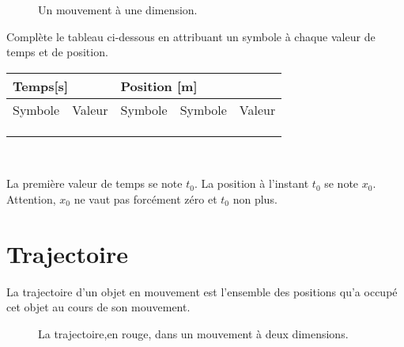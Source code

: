 \begin{figure}[!ht]
    \centering
    \resizebox{.7\linewidth}{!}{}
    \caption{Un mouvement à une dimension.}
    \label{position_referentiel_1}
\end{figure}

Complète le tableau ci-dessous en attribuant un symbole à chaque valeur de temps et de position.\\
\renewcommand{\arraystretch}{1.5}
\begin{tabularx}{\linewidth}{|X|X|X|X|X|}
    \hline
    \multicolumn{2}{|l|}{Temps[s]} & \multicolumn{3}{l|}{Position [m]}                              \\
    \hline
    Symbole                        & Valeur                            & Symbole & Symbole & Valeur \\
    \hline
                                   &                                   &         &         &        \\
    \hline
                                   &                                   &         &         &        \\
    \hline
                                   &                                   &         &         &        \\
    \hline
\end{tabularx}
\renewcommand{\arraystretch}{1}\\



\begin{encadre}
    La première valeur de temps se note \(t_0\). La position à l'instant \(t_0\) se note \(x_0\). Attention, \(x_0\) ne vaut pas forcément zéro et \(t_0\) non plus.
\end{encadre}

\newpage

\section{Trajectoire}
La trajectoire d'un objet en mouvement est l'ensemble des positions qu'a occupé cet objet au cours de son mouvement.

\begin{figure}[!ht]
    \centering
    \resizebox{.6\linewidth}{!}{}
    \caption{La trajectoire,en rouge, dans un mouvement à deux dimensions.}
    \label{position_referentiel_2}
\end{figure}

